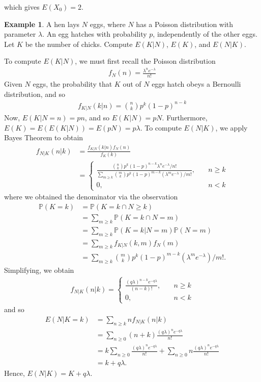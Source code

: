 \documentclass[12pt]{article}
\newcommand{\prob}{\mathbb{P}}
\theoremstyle{plain}
\theoremstyle{definition}
\newtheorem*{example}{Example}
\theoremstyle{remark}
\numberwithin{equation}{section}  %
\begin{document}
which gives $E(X_0) = 2$.
\begin{example}
	A hen lays $N$ eggs, where $N$ has a Poisson distribution with parameter
	$\lambda$. An egg hatches with probability $p$, independently  of the other
	eggs. Let $K$ be the number of chicks. Compute $E(K|N)$, $E(K)$, and $E(N | 
	K)$.
\end{example}
To compute $E(K|N)$, we must first recall the Poisson distribution
\begin{align*}
	f_N(n) = \frac{\lambda^n e^{-\lambda}}{n!}
\end{align*}
Given $N$ eggs, the probability that $K$ out of $N$ eggs hatch obeys a 
Bernoulli distribution, and so 
\begin{align*}
	f_{K|N}(k|n) = \binom{n}{k} p^k {(1-p)}^{n-k}
\end{align*}
Now, $E(K | N = n) = pn$, and so $E(K | N) = pN$. Furthermore, $E(K) = E(E(K
| N	)) = E(pN) = p \lambda$.
To compute $E(N | K)$, we apply Bayes Theorem to obtain
\begin{align*}
	f_{N|K}(n|k) & = \frac{f_{K|N}(k|n)f_N(n)}{f_K(k)}
	\\
	& = \begin{cases}
	\frac{\binom{n}{k}p^k {(1-p)}^{n-k} \lambda^n
	e^{-\lambda}/n!}{\sum_{m \ge k}
	\binom{m}{k} p^k {(1 - p)}^{m-k} (\lambda^m e^{-\lambda})/m!}
	, \quad & n \ge k
	\\
	0, \quad & n<k
\end{cases}
\end{align*}
where we obtained the denominator via the observation
\begin{align*}
	\prob(K = k) & = \prob(K = k \cap N \ge k) 
	\\
	& = \sum_{m \ge k} \prob(K =
	k \cap N = m) 
	\\
	& = \sum_{m \ge k} \prob(K = k | N = m) \prob(N = m)
	\\
	& = \sum_{m \ge k} f_{K|N}(k, m) f_N(m)
	\\
	& = \sum_{m \ge k}
	\binom{m}{k} p^k {(1 - p)}^{m-k} (\lambda^m e^{-\lambda})/m!.
\end{align*}
Simplifying, we obtain
\begin{align*}
	f_{N|K}(n|k) = 
	\begin{cases}
		\frac{{(q\lambda)}^{n-k} e^{-q\lambda}}{(n-k)!}, \quad & n \ge k
		\\
		0, \quad & n<k
	\end{cases}
\end{align*}
and so 
\begin{align*}
	E(N | K = k) & = \sum_{n \ge k} n f_{N|K}(n | k)
	\\
	& = \sum_{n \ge 0} (n + k) \frac{{(q \lambda)}^n e^{-q\lambda}}{n!}
	\\
	& = k \sum_{n \ge 0} \frac{{(q \lambda)}^n e^{-q\lambda}}{n!} + \sum_{n \ge 
0}
n \frac{{(q\lambda)}^n e^{-q\lambda}}{n!} 
\\
& = k + q\lambda.
\end{align*}
Hence, $E(N|K) = K + q \lambda$.
\end{document}
